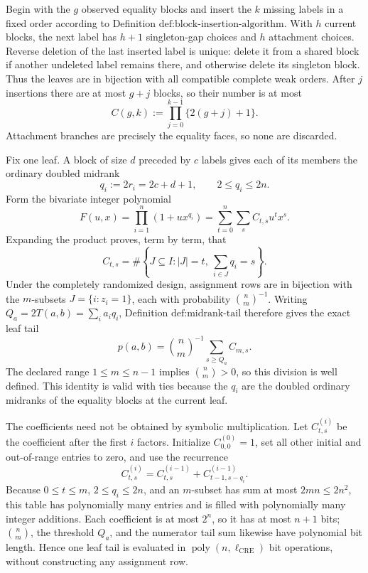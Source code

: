 Begin with the \(g\) observed equality blocks and insert the \(k\) missing
labels in a fixed order according to
Definition \(\text{def:block-insertion-algorithm}\).  With \(h\) current
blocks, the next label has \(h+1\) singleton-gap choices and \(h\) attachment
choices.  Reverse deletion of the last inserted label is unique: delete it
from a shared block if another undeleted label remains there, and otherwise
delete its singleton block.  Thus the leaves are in bijection with all
compatible complete weak orders.  After \(j\) insertions there are at most
\(g+j\) blocks, so their number is at most
\[
 C(g,k):=\prod_{j=0}^{k-1}\{2(g+j)+1\}.
\]
Attachment branches are precisely the equality faces, so none are discarded.

Fix one leaf.  A block of size \(d\) preceded by \(c\) labels gives each of its
members the ordinary doubled midrank
\[
 q_i:=2r_i=2c+d+1,
 \qquad 2\le q_i\le2n.
\]
Form the bivariate integer polynomial
\[
 F(u,x)=\prod_{i=1}^n(1+u x^{q_i})
       =\sum_{t=0}^n\sum_s C_{t,s}u^t x^s.
\]
Expanding the product proves, term by term, that
\[
 C_{t,s}
 =\#\left\{J\subseteq I:|J|=t,
                    \ \sum_{i\in J}q_i=s\right\}.
\]
Under the completely randomized design, assignment rows are in bijection with
the \(m\)-subsets \(J=\{i:z_i=1\}\), each with probability
\(\binom{n}{m}^{-1}\).  Writing \(Q_a=2T(a,b)=\sum_i a_iq_i\), Definition
\(\text{def:midrank-tail}\) therefore gives the exact leaf tail
\[
 p(a,b)=\binom{n}{m}^{-1}\sum_{s\ge Q_a}C_{m,s}.
\]
The declared range \(1\le m\le n-1\) implies \(\binom{n}{m}>0\), so this
division is well defined.
This identity is valid with ties because the \(q_i\) are the doubled ordinary
midranks of the equality blocks at the current leaf.

The coefficients need not be obtained by symbolic multiplication.  Let
\(C^{(i)}_{t,s}\) be the coefficient after the first \(i\) factors.  Initialize
\(C^{(0)}_{0,0}=1\), set all other initial and out-of-range entries to zero,
and use the recurrence
\[
 C^{(i)}_{t,s}
 =C^{(i-1)}_{t,s}+C^{(i-1)}_{t-1,s-q_i}.
\]
Because \(0\le t\le m\), \(2\le q_i\le2n\), and an \(m\)-subset has sum at
most \(2mn\le2n^2\), this table has polynomially many entries and is filled
with polynomially many integer additions.  Each coefficient is at most
\(2^n\), so it has at most \(n+1\) bits; \(\binom{n}{m}\), the threshold
\(Q_a\), and the numerator tail sum likewise have polynomial bit length.
Hence one leaf tail is evaluated in
\(\operatorname{poly}(n,\ell_{\mathrm{CRE}})\) bit operations, without
constructing any assignment row.

